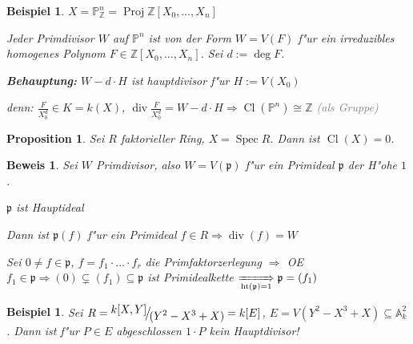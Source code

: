 \documentclass[paper = A4, fontsize=12pt, numbers=noendperiod, chapterprefix=true]{scrbook}
\theoremstyle{break}
\newtheorem{Prop}[Def]{Proposition}
\newtheorem{Bsp}[Def]{Beispiel}
\theoremstyle{nonumberbreak}
\newtheorem{bsp}{Beispiel}
\newtheorem{bew}{Beweis}
\theoremstyle{nonumberplain}
\DeclareMathOperator{\Cl}{Cl}
\DeclareMathOperator{\Proj}{Proj}
\DeclareMathOperator{\Spec}{Spec}
\DeclareMathOperator{\ddiv}{div}
\DeclareMathOperator{\Ht}{ht}
\newcommand{\A}{\mathbb{A}}
\newcommand{\IP}{\mathbb{P}}%
\newcommand{\Z}{\mathbb{Z}}
\newcommand{\p}{\mathfrak{p}} %
\newcommand{\FakRaum}[2]{
	\raisebox{0.7ex}{\ensuremath{#1}}
	\ensuremath{\mkern-3mu}\big/\ensuremath{\mkern-3mu}
	\raisebox{-0.6ex}{\ensuremath{#2}}}
\renewcommand{\OE}{O\!\!E~}
\begin{document}
\begin{Bsp}
$X = \IP_\Z^n = \Proj \Z[X_0,\ldots ,X_n]$

Jeder Primdivisor $W$ auf $\IP^n$ ist von der Form $W = V(F)$ f"ur ein irreduzibles homogenes Polynom $F \in \Z[X_0,\ldots ,X_n]$. Sei $d := \deg F$.

\textbf{Behauptung:} $W - d \cdot H$ ist hauptdivisor f"ur $H := V(X_0)$

\emph{denn:} $\frac{F}{X_0^d} \in K = k(X)$, $\ddiv \frac{F}{X_0^d} = W - d \cdot H \Rightarrow \Cl(\IP^n) \cong \Z$ \textcolor{gray}{(als Gruppe)}
\end{Bsp}

\begin{Prop}\label{11.3}
Sei $R$ faktorieller Ring, $X = \Spec R$. Dann ist $\Cl(X) = 0$.
\end{Prop}

\begin{bew}
Sei $W$ Primdivisor, also $W = V(\p)$ f"ur ein Primideal $\p$ der H"ohe $1$.

\begin{description}[\setlabelstyle{\bfseries}]
	\item[Behauptung:]$\p$ ist Hauptideal
\end{description}

Dann ist $\p(f)$ f"ur ein Primideal $f \in R \Rightarrow \ddiv(f) = W$

\begin{description}[\setlabelstyle{\itshape}]
	\item[Beweis der Behauptung:]Sei $0 \ne f \in \p$, $f = f_1 \cdot \ldots \cdot f_r$ die Primfaktorzerlegung $\Rightarrow$ \OE $f_1 \in \p \Rightarrow (0) \subsetneq (f_1) \subseteq \p$ ist Primidealkette $\xRightarrow[\Ht(\p) = 1]{} \p = (f_1)$
\end{description}\end{bew}

\begin{bsp}
Sei $R = \FakRaum{k[X,Y]}{(Y^2-X^3+X)} = k[E]$, $E = V(Y^2-X^3+X) \subseteq \A_k^2$. Dann ist f"ur $P \in E$ abgeschlossen $1 \cdot P$ kein Hauptdivisor!
\end{bsp}

\end{document}
